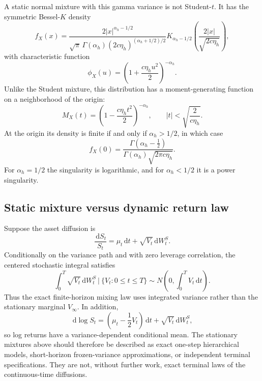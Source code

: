 \documentclass[11pt,a4paper]{article}
\newcommand{\dd}{\,\mathrm{d}}
\begin{document}
A static normal mixture with this gamma variance is not Student-$t$.  It has
the symmetric Bessel-$K$ density
\begin{equation}
  f_X(x)=
  \frac{2|x|^{\alpha_h-1/2}}
  {\sqrt{\pi}\,\Gamma(\alpha_h)(2c\eta_h)^{(\alpha_h+1/2)/2}}
  K_{\alpha_h-1/2}
  \left(\frac{2|x|}{\sqrt{2c\eta_h}}\right),
  \label{eq:gamma_normal_mixture}
\end{equation}
with characteristic function
\begin{equation}
  \phi_X(u)=\left(1+\frac{c\eta_hu^2}{2}\right)^{-\alpha_h}.
  \label{eq:gamma_mixture_cf}
\end{equation}
Unlike the Student mixture, this distribution has a moment-generating function
on a neighborhood of the origin:
\begin{equation}
  M_X(t)=\left(1-\frac{c\eta_ht^2}{2}\right)^{-\alpha_h},
  \qquad |t|<\sqrt{\frac{2}{c\eta_h}}.
  \label{eq:gamma_mixture_mgf}
\end{equation}
At the origin its density is finite if and only if $\alpha_h>1/2$, in which
case
\begin{equation}
  f_X(0)=\frac{\Gamma(\alpha_h-\tfrac12)}
  {\Gamma(\alpha_h)\sqrt{2\pi c\eta_h}}.
  \label{eq:gamma_mixture_origin}
\end{equation}
For $\alpha_h=1/2$ the singularity is logarithmic, and for $\alpha_h<1/2$ it
is a power singularity.

\subsection{Static mixture versus dynamic return law}

Suppose the asset diffusion is
\begin{equation}
  \frac{\dd S_t}{S_t}=\mu_t\dd t+\sqrt{V_t}\dd W_t^S.
\end{equation}
Conditionally on the variance path and with zero leverage correlation, the
centered stochastic integral satisfies
\begin{equation}
  \int_0^T\sqrt{V_t}\dd W_t^S
  \ \Big|\ \{V_t:0\le t\le T\}
  \sim N\left(0,\int_0^TV_t\dd t\right).
  \label{eq:integrated_variance_mixture}
\end{equation}
Thus the exact finite-horizon mixing law uses integrated variance rather than
the stationary marginal $V_\infty$.  In addition,
\begin{equation}
  \dd\log S_t=\left(\mu_t-\frac12V_t\right)\dd t
  +\sqrt{V_t}\dd W_t^S,
\end{equation}
so log returns have a variance-dependent conditional mean.  The stationary
mixtures above should therefore be described as exact one-step hierarchical
models, short-horizon frozen-variance approximations, or independent terminal
specifications.  They are not, without further work, exact terminal laws of the
continuous-time diffusions.
\end{document}
